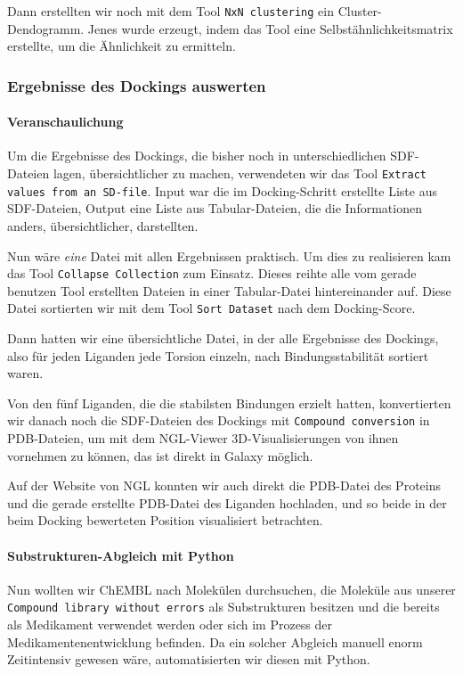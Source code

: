 \documentclass[10pt]{article}
\begin{document}
    Dann erstellten wir noch mit dem Tool \texttt{NxN clustering} ein Cluster-Dendogramm. Jenes wurde erzeugt, indem das
    Tool eine Selbstähnlichkeitsmatrix erstellte, um die Ähnlichkeit zu ermitteln.

    \subsubsection{Ergebnisse des Dockings auswerten}

    \paragraph{Veranschaulichung}
    Um die Ergebnisse des Dockings, die bisher noch in unterschiedlichen SDF-Dateien lagen, übersichtlicher zu
    machen, verwendeten wir das Tool \texttt{Extract values from an SD-file}. Input war die im Docking-Schritt erstellte
    Liste aus SDF-Dateien, Output eine Liste aus Tabular-Dateien, die die Informationen anders, übersichtlicher,
    darstellten.

    Nun wäre \emph{eine} Datei mit allen Ergebnissen praktisch. Um dies zu realisieren kam das Tool \texttt{Collapse
    Collection}
    zum Einsatz. Dieses reihte alle vom gerade benutzen Tool erstellten Dateien in einer Tabular-Datei hintereinander
    auf. Diese Datei sortierten wir mit dem Tool \texttt{Sort Dataset} nach dem Docking-Score.

    Dann hatten wir eine übersichtliche Datei, in der alle Ergebnisse des Dockings, also für jeden Liganden jede
    Torsion einzeln, nach Bindungsstabilität sortiert waren.

    Von den fünf Liganden, die die stabilsten Bindungen erzielt hatten, konvertierten wir danach noch die SDF-Dateien
    des Dockings mit \texttt{Compound conversion} in PDB-Dateien, um mit dem NGL-Viewer 3D-Visualisierungen von ihnen
    vornehmen zu können, das ist direkt in Galaxy möglich.\cite{19}

    Auf der Website von NGL konnten wir auch direkt die PDB-Datei des Proteins und die gerade erstellte PDB-Datei des
    Liganden hochladen, und so beide in der beim Docking bewerteten Position visualisiert betrachten.

    \paragraph{Substrukturen-Abgleich mit Python}
    Nun wollten wir ChEMBL nach Molekülen durchsuchen, die Moleküle aus unserer \texttt{Compound library without errors}
    als Substrukturen besitzen und die bereits als Medikament verwendet werden oder sich im Prozess der
    Medikamentenentwicklung befinden.
    Da ein solcher Abgleich manuell enorm Zeitintensiv gewesen wäre, automatisierten wir diesen mit Python.
\end{document}
